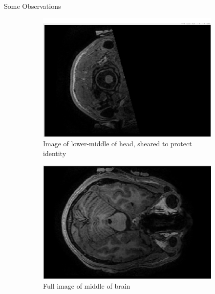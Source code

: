 \documentclass[aspectratio=169,xcolor=dvipsnames]{beamer}
\begin{document}
	\begin{frame}{Some Observations}
		\begin{figure}
			\centering
			\begin{subfigure}[t]{0.3\textwidth}
				\centering
				\includegraphics[width=\linewidth]{ShearedBrainScan.png} 
				\caption{Image of lower-middle of head, sheared to protect identity}
			\end{subfigure}
			\hfill
			\begin{subfigure}[t]{0.3\textwidth}
				\centering
				\includegraphics[width=\linewidth]{BrainScan.png} 
				\caption{Full image of middle of brain}
			\end{subfigure}
			\hfill
			\begin{subfigure}[t]{0.3\textwidth}
				\centering

\end{subfigure}
\end{figure}
\end{frame}
\end{document}
